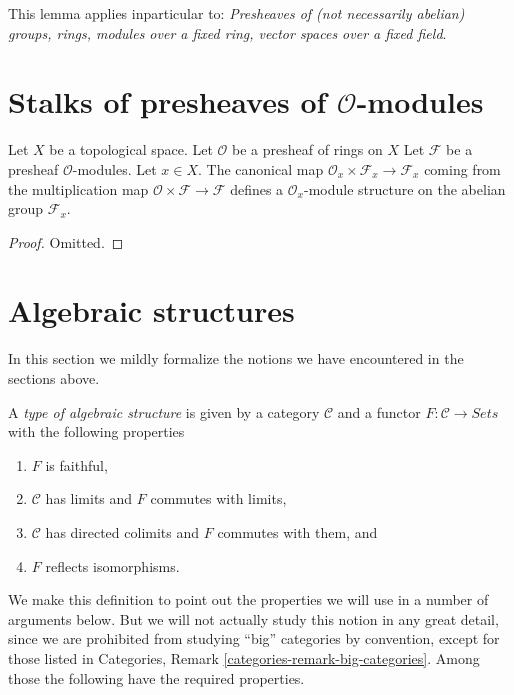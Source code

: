 \medskip\noindent
This lemma applies inparticular to:
{\it Presheaves of (not necessarily abelian) groups, rings, modules
over a fixed ring, vector spaces over a fixed field}.

\section{Stalks of presheaves of $\mathcal{O}$-modules}
\label{section-stalk-presheaves-modules}

\begin{lemma}
\label{lemma-stalk-module}
Let $X$ be a topological space.
Let $\mathcal{O}$ be a presheaf of rings on $X$
Let $\mathcal{F}$ be a presheaf $\mathcal{O}$-modules.
Let $x \in X$.
The canonical map $\mathcal{O}_x \times \mathcal{F}_x
\to \mathcal{F}_x$ coming from the multiplication map
$\mathcal{O}\times\mathcal{F} \to \mathcal{F}$ defines
a $\mathcal{O}_x$-module structure on the abelian group
$\mathcal{F}_x$.
\end{lemma}

\begin{proof}
Omitted.
\end{proof}



\section{Algebraic structures}
\label{section-algebraic-structures}

\noindent
In this section we mildly formalize the notions we have
encountered in the sections above.

\begin{definition}
\label{definition-algebraic-structure}
A {\it type of algebraic structure} is given by a category $\mathcal{C}$
and a functor $F : \mathcal{C} \to \textit{Sets}$ with the
following properties
\begin{enumerate}
\item $F$ is faithful,
\item $\mathcal{C}$ has limits and $F$ commutes with limits,
\item $\mathcal{C}$ has directed colimits and $F$ commutes with them, and
\item $F$ reflects isomorphisms.
\end{enumerate}
\end{definition}

\noindent
We make this definition to point out the properties
we will use in a number of arguments below.  But we will
not actually study this notion in any great detail, since we
are prohibited from studying ``big'' categories by convention,
except for those listed in
Categories, Remark \ref{categories-remark-big-categories}.
Among those the following have the required properties.

